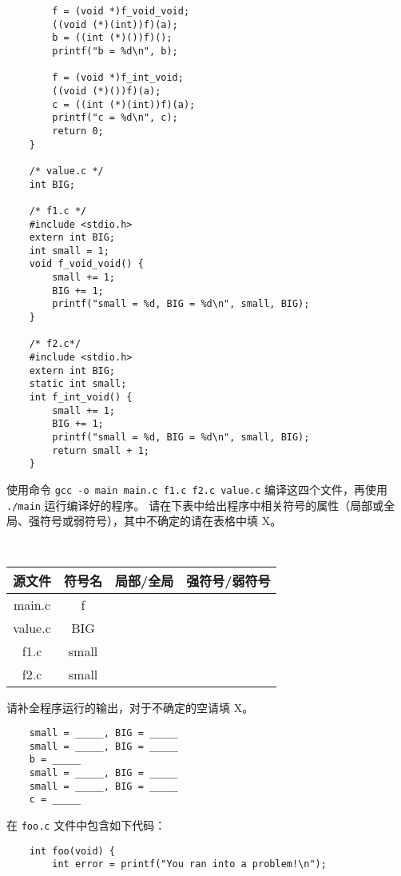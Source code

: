 \begin{problems}
\begin{verbatim}
        f = (void *)f_void_void;
        ((void (*)(int))f)(a);
        b = ((int (*)())f)();
        printf("b = %d\n", b);

        f = (void *)f_int_void;
        ((void (*)())f)(a);
        c = ((int (*)(int))f)(a);
        printf("c = %d\n", c);
        return 0;
    }

    /* value.c */
    int BIG;

    /* f1.c */
    #include <stdio.h>
    extern int BIG;
    int small = 1;
    void f_void_void() {
        small += 1;
        BIG += 1;
        printf("small = %d, BIG = %d\n", small, BIG);
    }

    /* f2.c*/
    #include <stdio.h>
    extern int BIG;
    static int small;
    int f_int_void() {
        small += 1;
        BIG += 1;
        printf("small = %d, BIG = %d\n", small, BIG);
        return small + 1;
    }
        \end{verbatim}
        使用命令 \verb|gcc -o main main.c f1.c f2.c value.c| 编译这四个文件，再使用 \verb|./main| 运行编译好的程序。
        \qn 请在下表中给出程序中相关符号的属性（局部或全局、强符号或弱符号），其中不确定的请在表格中填 X。
        \begin{table}[H]
            \tt
            \centering
            \begin{tabular}{|c|c|c|c|}
                \hline
                源文件 & 符号名 & {\qquad \qquad 局部/全局 \qquad \qquad} & {\qquad \qquad 强符号/弱符号 \qquad \qquad} \\ \hline
                main.c & f &  &  \\ \hline
                value.c & BIG &  &  \\ \hline
                f1.c & small &  &  \\ \hline
                f2.c & small &  &  \\ \hline
            \end{tabular}
        \end{table}
        \qn 请补全程序运行的输出，对于不确定的空请填 X。
        \begin{verbatim}
    small = _____, BIG = _____
    small = _____, BIG = _____
    b = _____
    small = _____, BIG = _____
    small = _____, BIG = _____
    c = _____
        \end{verbatim}
         在 \verb|foo.c| 文件中包含如下代码：
        \begin{verbatim}
    int foo(void) {
        int error = printf("You ran into a problem!\n");

\end{verbatim}
\end{problems}
